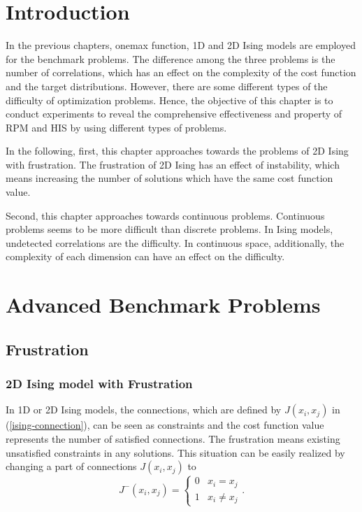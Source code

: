 \section{Introduction}
In the previous chapters, 
onemax function, 1D and 2D Ising models are employed 
for the benchmark problems.
The difference among the three problems is 
the number of correlations, 
which has an effect on the complexity of the cost function and 
the target distributions.
However, there are some different types of the difficulty of
optimization problems.
Hence, the objective of this chapter is
to conduct experiments to reveal the comprehensive effectiveness and 
property of RPM and HIS by using different types of problems.

In the following,
first, this chapter approaches 
towards the problems of 2D Ising with frustration.
The frustration of 2D Ising has an effect of instability, 
which means increasing the number of solutions
which have the same cost function value. 

Second,
this chapter approaches towards continuous problems.
Continuous problems seems to be more difficult than discrete problems.
In Ising models, undetected correlations are the difficulty.
In continuous space, additionally, the complexity of each dimension 
can have an effect on the difficulty.


\section{Advanced Benchmark Problems}
\subsection{Frustration}
\subsubsection{2D Ising model with Frustration}
In 1D or 2D Ising models,
the connections, which are defined by $J(x_i,x_j)$ 
in (\ref{ising-connection}), 
can be seen as constraints and
the cost function value represents the number of satisfied connections.
The frustration means existing unsatisfied constraints in any solutions.
This situation can be easily realized by
changing a part of connections $J(x_i,x_j)$ to
\begin{equation}
 J^{-}(x_i,x_j)= \left\{
  \begin{array}{rl}
    0 & x_i=x_j \\
    1 & x_i \neq x_j
  \end{array} \right.
.
\end{equation}

